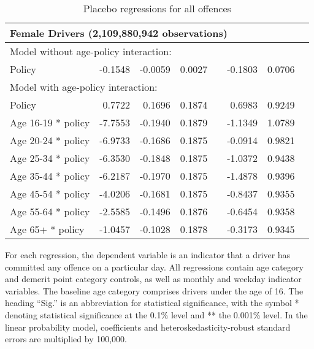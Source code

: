 \begin{table}
\begin{tabular}{l r r r l r r l}
\hline 

\multicolumn{7}{l}{\textbf{Female Drivers} (2,109,880,942  observations)} \\ 

\hline
\multicolumn{7}{l}{Model without age-policy interaction: } \\ 
Policy                   &  -0.1548       &  -0.0059        &  0.0027       &            &  -0.1803        &  0.0706       &            \\ 
\hline
\multicolumn{7}{l}{Model with age-policy interaction: } \\ 
Policy                   &  0.7722       &  0.1696        &  0.1874       &            &  0.6983        &  0.9249       &            \\ 
Age 16-19 * policy   &  -7.7553       &  -0.1940        &  0.1879       &            &  -1.1349        &  1.0789       &            \\ 
Age 20-24 * policy   &  -6.9733       &  -0.1686        &  0.1875       &            &  -0.0914        &  0.9821       &            \\ 
Age 25-34 * policy   &  -6.3530       &  -0.1848        &  0.1875       &            &  -1.0372        &  0.9438       &            \\ 
Age 35-44 * policy   &  -6.2187       &  -0.1970        &  0.1875       &            &  -1.4878        &  0.9396       &            \\ 
Age 45-54 * policy   &  -4.0206       &  -0.1681        &  0.1875       &            &  -0.8437        &  0.9355       &            \\ 
Age 55-64 * policy   &  -2.5585       &  -0.1496        &  0.1876       &            &  -0.6454        &  0.9358       &            \\ 
Age 65+ * policy   &  -1.0457       &  -0.1028        &  0.1878       &            &  -0.3173        &  0.9345       &            \\ 

\hline 

\end{tabular} 
\caption{Placebo regressions for all offences} 
For each regression, the dependent variable is an indicator that a driver has committed  
any offence on a particular day.  
All regressions contain age category and demerit point category controls, 
as well as monthly and weekday indicator variables. 
The baseline age category comprises drivers under the age of 16. 
The heading ``Sig.'' is an abbreviation for statistical significance, with 
the symbol * denoting statistical significance at the 0.1\% level 
and ** the 0.001\% level. 
In the linear probability model, coefficients and heteroskedasticity-robust standard errors are  
multiplied by 100,000.  
\label{tab:seas_Logit_vs_LPMx100K_placebo_regs} 
\end{table} 
 
